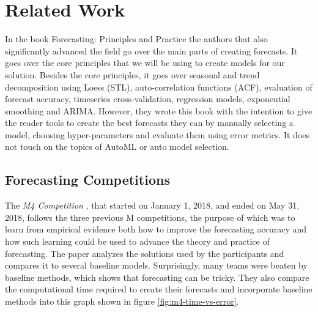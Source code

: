 \section{Related Work}

In the book Forecasting: Principles and Practice \cite{fpp3} the authors that also significantly advanced the field go over the main parts of creating forecasts. It goes over the core principles that we will be using to create models for our solution. Besides the core principles, it goes over seasonal and trend decomposition using Loess (STL), auto-correlation functions (ACF), evaluation of forecast accuracy, timeseries cross-validation, regression models, exponential smoothing and ARIMA. However, they wrote this book with the intention to give the reader tools to create the best forecasts they can by manually selecting a model, choosing hyper-parameters and evaluate them using error metrics. It does not touch on the topics of AutoML or auto model selection.


\subsection{Forecasting Competitions}

The \emph{M4 Competition} \cite{M4}, that started on January 1, 2018, and ended on May 31, 2018, follows the three previous M competitions, the purpose of which was to learn from empirical evidence both how to improve the forecasting accuracy and how such learning could be used to advance the theory and practice of forecasting. The paper analyzes the solutions used by the participants and compares it to several baseline models. Surprisingly, many teams were beaten by baseline methods, which shows that forecasting can be tricky. They also compare the computational time required to create their forecasts and incorporate baseline methods into this graph shown in figure \ref{fig:m4-time-vs-error}.

